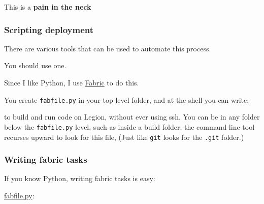 This is a \textbf{pain in the neck}

\subsubsection{Scripting deployment}\label{scripting-deployment}

There are various tools that can be used to automate this process.

You should use one.

Since I like Python, I use
\href{http://docs.fabfile.org/en/1.10/index.html}{Fabric} to do this.

You create \texttt{fabfile.py} in your top level folder, and at the
shell you can write:

\begin{Shaded}
\begin{Highlighting}[]
 
 
 
 
\end{Highlighting}
\end{Shaded}

to build and run code on Legion, without ever using ssh. You can be in
any folder below the \texttt{fabfile.py} level, such as inside a build
folder; the command line tool recurses upward to look for this file,
(Just like \texttt{git} looks for the \texttt{.git} folder.)

\subsubsection{Writing fabric tasks}\label{writing-fabric-tasks}

If you know Python, writing fabric tasks is easy:

\href{https://github.com/UCL/SmoothLifeExample/blob/parallel/deploy/legion.py}{fabfile.py}:

\begin{Shaded}
\begin{Highlighting}[]
 
     \NormalTok{):}
         \NormalTok{):}
            \NormalTok{)}
\end{Highlighting}
\end{Shaded}

\begin{Shaded}
\begin{Highlighting}[]
 
\end{Highlighting}
\end{Shaded}

